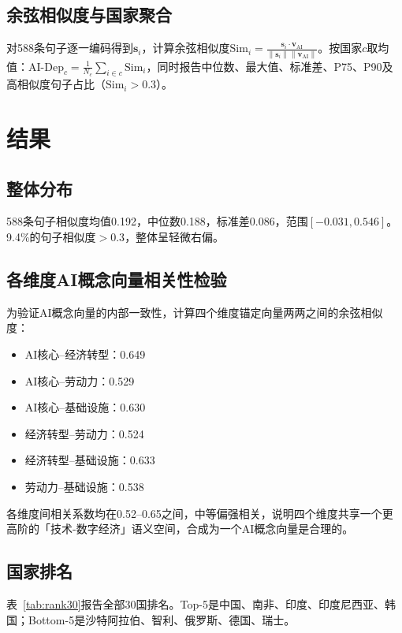 \documentclass[11pt,a4paper]{article}
\begin{document}
\subsection{余弦相似度与国家聚合}
对588条句子逐一编码得到$\mathbf{s}_i$，计算余弦相似度$\text{Sim}_i=\frac{\mathbf{s}_i\cdot\mathbf{v}_{\text{AI}}}{\|\mathbf{s}_i\|\|\mathbf{v}_{\text{AI}}\|}$。按国家$c$取均值：$\text{AI-Dep}_c=\frac{1}{N_c}\sum_{i\in c}\text{Sim}_i$，同时报告中位数、最大值、标准差、P75、P90及高相似度句子占比（$\text{Sim}_i>0.3$）。

\section{结果}

\subsection{整体分布}
588条句子相似度均值0.192，中位数0.188，标准差0.086，范围$[-0.031, 0.546]$。9.4\%的句子相似度$>0.3$，整体呈轻微右偏。

\subsection{各维度AI概念向量相关性检验}
为验证AI概念向量的内部一致性，计算四个维度锚定向量两两之间的余弦相似度：
\begin{itemize}[nosep]
\item AI核心--经济转型：0.649
\item AI核心--劳动力：0.529
\item AI核心--基础设施：0.630
\item 经济转型--劳动力：0.524
\item 经济转型--基础设施：0.633
\item 劳动力--基础设施：0.538
\end{itemize}
各维度间相关系数均在0.52--0.65之间，中等偏强相关，说明四个维度共享一个更高阶的「技术-数字经济」语义空间，合成为一个AI概念向量是合理的。

\subsection{国家排名}
表~\ref{tab:rank30}报告全部30国排名。Top-5是中国、南非、印度、印度尼西亚、韩国；Bottom-5是沙特阿拉伯、智利、俄罗斯、德国、瑞士。
\end{document}
